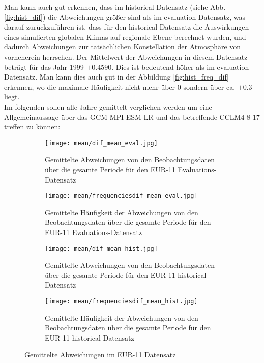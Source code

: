 \newpage

Man kann auch gut erkennen, dass im historical-Datensatz (siehe Abb. \ref{fig:hist_dif}) die Abweichungen größer sind als im evaluation Datensatz, was darauf zurückzuführen ist, dass für den historical-Datensatz die Auswirkungen eines simulierten globalen Klimas auf regionale Ebene berechnet wurden, und dadurch Abweichungen zur tatsächlichen Konstellation der Atmosphäre von vorneherein herrschen. Der Mittelwert der Abweichungen in diesem Datensatz beträgt für das Jahr 1999 $+0.4590$. Dies ist bedeutend höher als im evaluation-Datensatz. Man kann dies auch gut in der Abbildung \ref{fig:hist_freq_dif} erkennen, wo die maximale Häufigkeit nicht mehr über $0$ sondern über ca. $+0.3$ liegt.\\
Im folgenden sollen alle Jahre gemittelt verglichen werden um eine Allgemeinaussage über das GCM MPI-ESM-LR und das betreffende CCLM4-8-17 treffen zu können:\\
\begin{figure}[hbt!]
	\begin{subfigure}{0.49\textwidth}
	\centering
	\texttt{[image: mean/dif\_mean\_eval.jpg]}
	\caption{Gemittelte Abweichungen von den Beobachtungsdaten über die gesamte Periode für den EUR-11 Evaluations-Datensatz}
	\label{fig:mean_dif_eval}
	\end{subfigure}
	\begin{subfigure}{0.49\textwidth}
		\centering
		\texttt{[image: mean/frequenciesdif\_mean\_eval.jpg]}
		\caption{Gemittelte Häufigkeit der Abweichungen von den Beobachtungsdaten über die gesamte Periode für den EUR-11 Evaluations-Datensatz}
		\label{fig:freq_mean_dif_eval}
	\end{subfigure}
	\begin{subfigure}{0.49\textwidth}
	\centering
	\texttt{[image: mean/dif\_mean\_hist.jpg]}
	\caption{Gemittelte Abweichungen von den Beobachtungsdaten über die gesamte Periode für den EUR-11 historical-Datensatz}
	\label{fig:mean_dif_hist}
	\end{subfigure}
	\begin{subfigure}{0.49\textwidth}
			\centering
		\texttt{[image: mean/frequenciesdif\_mean\_hist.jpg]}
		\caption{Gemittelte Häufigkeit der Abweichungen von den Beobachtungsdaten über die gesamte Periode für den EUR-11  historical-Datensatz}
		\label{fig:freq_mean_dif_hist}
	\end{subfigure}
	\caption{Gemittelte Abweichungen im EUR-11 Datensatz}
\end{figure}
